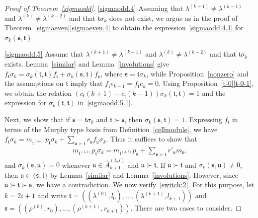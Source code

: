 \documentclass[11pt,a4paper,reqno,svgnames]{amsart}
\theoremstyle{plain}
\theoremstyle{definition}
\numberwithin{equation}{section}
\begin{document}
\begin{proof}[Proof of Theorem~\ref{sigmaodd}]
\eqref{sigmaodd.4} Assuming that  $\lambda^{(k+1)}\ne \lambda^{(k-1)}$ and $\lambda^{(k)}\ne\lambda^{(k-2)}$ and that $\mathfrak{t}\sigma_k$ does not exist, we argue as in the proof of Theorem~\ref{sigmaeven}\eqref{sigmaeven.4} to obtain the expression~\eqref{sigmaodd.4.1} for $\sigma_{k}(\mathfrak{s,t})$. 

\eqref{sigmaodd.5} Assume that  $\lambda^{(k+1)}\ne \lambda^{(k-1)}$ and $\lambda^{(k)}\ne\lambda^{(k-2)}$ and that $\mathfrak{t}\sigma_k$ exists. Lemma~\ref{similar} and Lemma~\ref{involutions} give $
f_\mathfrak{t}\sigma_k=\sigma_{k}(\mathfrak{t,t})f_\mathfrak{t}+\sigma_k(\mathfrak{s,t})f_\mathfrak{s}$, 
where $\mathfrak{s}=\mathfrak{t}\sigma_k$, while Proposition~\ref{nonzero} and the assumptions on $\mathfrak{t}$ imply that $f_\mathfrak{t}e_{k-1}=f_\mathfrak{t}e_k=0$. Using Proposition~\ref{t-0}\eqref{t-0-1}, we obtain the relation $(c_\mathfrak{t}(k+1)-c_\mathfrak{t}(k-1))\sigma_k(\mathfrak{t,t})=1$ and the expression for $\sigma_k(\mathfrak{t,t})$ in~\eqref{sigmaodd.5.1}. 

Next, we show that if $\mathfrak{s}=\mathfrak{t}\sigma_k$ and $\mathfrak{t}\succ\mathfrak{s}$, then $\sigma_k(\mathfrak{s,t})=1$. Expressing $f_\mathfrak{t}$ in terms of the Murphy type basis  from Definition~\ref{cellmodule}, we have 
 $f_\mathfrak{t}\sigma_k=m_{\mathfrak{t}^{(\lambda,l)}}p_\mathfrak{t}\sigma_k+\sum_{\mathfrak{u}\succ\mathfrak{t}}r_\mathfrak{u}f_\mathfrak{u}\sigma_k$. 
Thus it suffices to show that 
\begin{align}\label{switch:2}
m_{\mathfrak{t}^{(\lambda,l)}}p_\mathfrak{t}\sigma_k=m_{\mathfrak{t}^{(\lambda,l)}}p_\mathfrak{s} +\sum_{\mathfrak{v}\succ\mathfrak{t}}r'_\mathfrak{v}m_\mathfrak{v}.
\end{align}
and $\sigma_k(\mathfrak{s,u})=0$ whenever $\mathfrak{u}\in\hat{A}_{k+1}^{(\lambda,l)}$ and $\mathfrak{u}\succ\mathfrak{t}$. If $\mathfrak{u}\succ\mathfrak{t}$ and $\sigma_k(\mathfrak{s,u})\ne0$, then $\mathfrak{u}\in\lbrace\mathfrak{s,t}\rbrace$ by Lemma~\ref{similar} and Lemma~\ref{involutions}. However, since $\mathfrak{u}\succ\mathfrak{t}\succ\mathfrak{s}$, we have a contradiction. We now verify~\eqref{switch:2}. For this purpose, let $k=2i+1$ and write $\mathfrak{t}=((\lambda^{(0)},l_0),\ldots,(\lambda^{(k+1)},l_{k+1}))$ and $\mathfrak{s}=((\rho^{(0)},r_0),\ldots,(\rho^{(k+1)},r_{k+1}))$. There are two cases to consider. 


\end{proof}
\end{document}

